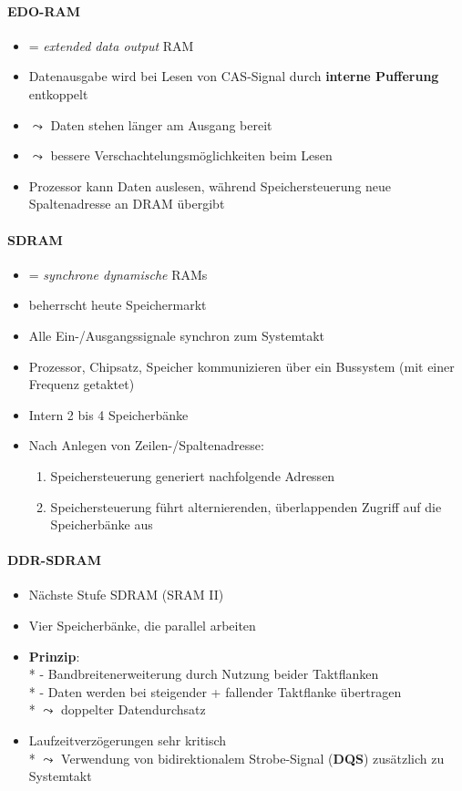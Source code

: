 \paragraph{EDO-RAM}
\begin{itemize}
	\item = \emph{extended data output} RAM
	\item Datenausgabe wird bei Lesen von CAS-Signal durch \textbf{interne Pufferung} entkoppelt
	\item \( \leadsto \) Daten stehen länger am Ausgang bereit
	\item \( \leadsto \) bessere Verschachtelungsmöglichkeiten beim Lesen
	\item Prozessor kann Daten auslesen, während Speichersteuerung neue Spaltenadresse an DRAM übergibt
\end{itemize}

\paragraph{SDRAM}
\begin{itemize}
	\item = \emph{synchrone dynamische} RAMs
	\item beherrscht heute Speichermarkt
	\item Alle Ein-/Ausgangssignale synchron zum Systemtakt
	\item Prozessor, Chipsatz, Speicher kommunizieren über ein Bussystem (mit einer Frequenz getaktet)
	\item Intern 2 bis 4 Speicherbänke
	\item Nach Anlegen von Zeilen-/Spaltenadresse:
	\begin{enumerate}
		\item Speichersteuerung generiert nachfolgende Adressen
		\item Speichersteuerung führt alternierenden, überlappenden Zugriff auf die Speicherbänke aus
	\end{enumerate}
\end{itemize}

\paragraph{DDR-SDRAM}
\begin{itemize}
	\item Nächste Stufe SDRAM (SRAM II)
	\item Vier Speicherbänke, die parallel arbeiten
	\item \textbf{Prinzip}: \\*
	 	- Bandbreitenerweiterung durch Nutzung beider Taktflanken \\*
	 	- Daten werden bei steigender + fallender Taktflanke übertragen \\*
	 	\( \leadsto \) doppelter Datendurchsatz
	\item Laufzeitverzögerungen sehr kritisch \\*
		\( \leadsto \) Verwendung von bidirektionalem Strobe-Signal (\textbf{DQS}) zusätzlich zu Systemtakt
\end{itemize}

